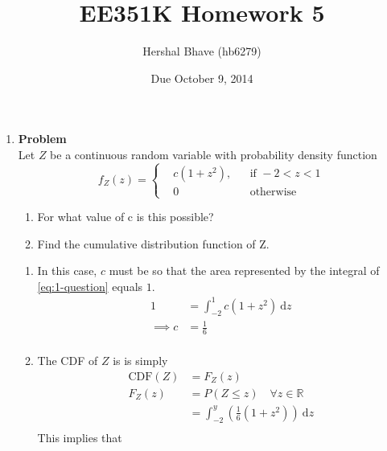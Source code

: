 \documentclass[12pt]{article}
\title{EE351K Homework 5}
\author{Hershal Bhave (hb6279)}
\date{Due October 9, 2014}
\newenvironment{Ex}{\textbf{Problem}\vspace{.75em}\\}{}
\newcommand{\dd}[1]{\:\mathrm{d}{#1}}
\begin{document}
\maketitle
\begin{enumerate}
\item
  \begin{Ex}
    Let $Z$ be a continuous random variable with probability density
    function
    \begin{equation}
      \label{eq:1-question}
      f_Z(z) = \left\{
        \begin{aligned}
          & c(1+z^2), && \text{if }-2<z<1 \\
          & 0 && \text{otherwise}
        \end{aligned} \right.
    \end{equation}
    \begin{enumerate}
    \item For what value of c is this possible?
    \item Find the cumulative distribution function of Z.
    \end{enumerate}
    \begin{solution} \hfill
      \begin{enumerate}
      \item In this case, $c$ must be so that the area represented by
        the integral of \cref{eq:1-question} equals $1$.
        \begin{equation}
          \label{eq:1a-sol}
          \begin{aligned}
            1 &= \int_{-2}^{1} c(1+z^2) \dd{z} \\
            \implies c &= \frac{1}{6} \\
          \end{aligned}
        \end{equation}
      \item The CDF of $Z$ is is simply
        \begin{equation}
          \label{eq:1b-sol}
          \begin{aligned}
            \text{CDF}(Z) &= F_Z(z) \\
            F_Z(z) &= P(Z\le z) \quad \forall z \in \mathbb{R} \\
            &= \int_{-2}^{y} \left(\frac{1}{6}(1+z^2)\right) \dd{z} \\
          \end{aligned}
        \end{equation}
        This implies that
        \begin{equation}

\end{equation}
\end{enumerate}
\end{solution}
\end{Ex}
\end{enumerate}
\end{document}
